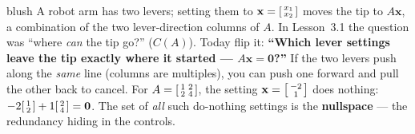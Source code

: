 \documentclass[10pt]{article}
\newcommand{\xx}{\mathbf{x}}
\newcommand{\zero}{\mathbf{0}}
\begin{document}
\begin{skillbox}[Hook]{blush}
    A robot arm has two levers; setting them to $\xx=\begin{bsmallmatrix} x_1\\x_2 \end{bsmallmatrix}$
    moves the tip to $A\xx$, a combination of the two lever-direction columns of $A$. In Lesson~3.1
    the question was ``where \emph{can} the tip go?'' ($C(A)$). Today flip it: \textbf{``Which lever
    settings leave the tip exactly where it started --- $A\xx=\zero$?''} If the two levers push along
    the \emph{same} line (columns are multiples), you can push one forward and pull the other back to
    cancel. For $A=\begin{bsmallmatrix} 1 & 2\\ 2 & 4 \end{bsmallmatrix}$, the setting
    $\xx=\begin{bsmallmatrix} -2\\1 \end{bsmallmatrix}$ does nothing:
    $-2\begin{bsmallmatrix} 1\\2 \end{bsmallmatrix}+1\begin{bsmallmatrix} 2\\4 \end{bsmallmatrix}=\zero$.
    The set of \emph{all} such do-nothing settings is the \textbf{nullspace} --- the redundancy hiding
    in the controls.
\end{skillbox}
\end{document}
